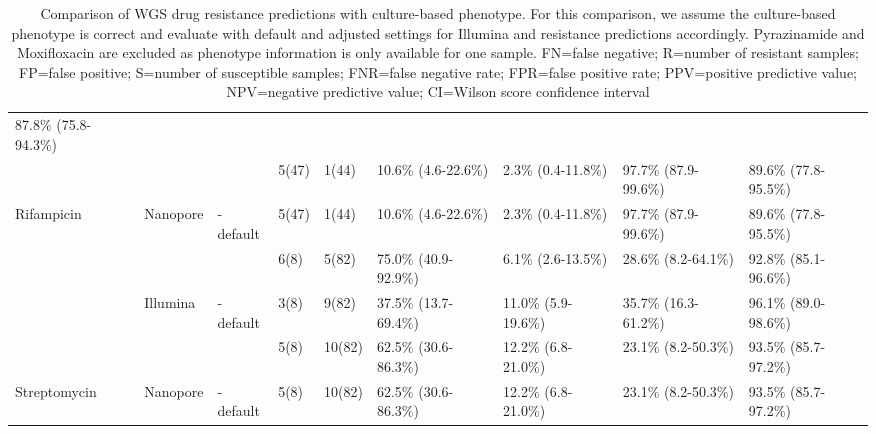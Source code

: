 \begin{table}
{\begin{tabular}{|l|l|l|l|l|l|l|l|l|}
  \cellcolor[HTML]{EFEFEF}87.8\% (75.8-94.3\%) \\ \cline{2-9} 
 &
   &
  \mykrobe{} &
  5(47) &
  1(44) &
  10.6\% (4.6-22.6\%) &
  2.3\% (0.4-11.8\%) &
  97.7\% (87.9-99.6\%) &
  89.6\% (77.8-95.5\%) \\ \cline{3-9} 
\multirow{-4}{*}{Rifampicin} &
  \multirow{-2}{*}{Nanopore} &
  \cellcolor[HTML]{EFEFEF}\mykrobe{}-default &
  \cellcolor[HTML]{EFEFEF}5(47) &
  \cellcolor[HTML]{EFEFEF}1(44) &
  \cellcolor[HTML]{EFEFEF}10.6\% (4.6-22.6\%) &
  \cellcolor[HTML]{EFEFEF}2.3\% (0.4-11.8\%) &
  \cellcolor[HTML]{EFEFEF}97.7\% (87.9-99.6\%) &
  \cellcolor[HTML]{EFEFEF}89.6\% (77.8-95.5\%) \\ \hline
 &
   &
  \mykrobe{} &
  6(8) &
  5(82) &
  75.0\% (40.9-92.9\%) &
  6.1\% (2.6-13.5\%) &
  28.6\% (8.2-64.1\%) &
  92.8\% (85.1-96.6\%) \\ \cline{3-9} 
 &
  \multirow{-2}{*}{Illumina} &
  \cellcolor[HTML]{EFEFEF}\mykrobe{}-default &
  \cellcolor[HTML]{EFEFEF}3(8) &
  \cellcolor[HTML]{EFEFEF}9(82) &
  \cellcolor[HTML]{EFEFEF}37.5\% (13.7-69.4\%) &
  \cellcolor[HTML]{EFEFEF}11.0\% (5.9-19.6\%) &
  \cellcolor[HTML]{EFEFEF}35.7\% (16.3-61.2\%) &
  \cellcolor[HTML]{EFEFEF}96.1\% (89.0-98.6\%) \\ \cline{2-9} 
 &
   &
  \mykrobe{} &
  5(8) &
  10(82) &
  62.5\% (30.6-86.3\%) &
  12.2\% (6.8-21.0\%) &
  23.1\% (8.2-50.3\%) &
  93.5\% (85.7-97.2\%) \\ \cline{3-9} 
\multirow{-4}{*}{Streptomycin} &
  \multirow{-2}{*}{Nanopore} &
  \cellcolor[HTML]{EFEFEF}\mykrobe{}-default &
  \cellcolor[HTML]{EFEFEF}5(8) &
  \cellcolor[HTML]{EFEFEF}10(82) &
  \cellcolor[HTML]{EFEFEF}62.5\% (30.6-86.3\%) &
  \cellcolor[HTML]{EFEFEF}12.2\% (6.8-21.0\%) &
  \cellcolor[HTML]{EFEFEF}23.1\% (8.2-50.3\%) &
  \cellcolor[HTML]{EFEFEF}93.5\% (85.7-97.2\%) \\ \hline
\end{tabular}%
}
\caption{Comparison of WGS drug resistance predictions with culture-based phenotype. For this comparison, we assume the culture-based phenotype is correct and evaluate \mykrobe{} with default and adjusted settings for Illumina and \ont{} resistance predictions accordingly. Pyrazinamide and Moxifloxacin are excluded as phenotype information is only available for one sample. FN=false negative; R=number of resistant samples; FP=false positive; S=number of susceptible samples; FNR=false negative rate; FPR=false positive rate; PPV=positive predictive value; NPV=negative predictive value; CI=Wilson score confidence interval}
\label{tab:mykrobe-settings-pheno}
\end{table}

